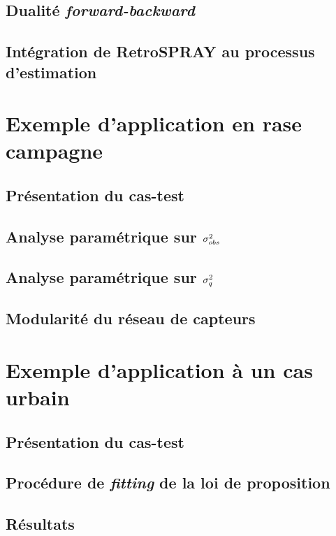 \subsection{Dualité \textit{forward-backward}}

\subsection{Intégration de RetroSPRAY au processus d'estimation}

\section{Exemple d'application en rase campagne}

\subsection{Présentation du cas-test}

\subsection{Analyse paramétrique sur ${\sigma_{obs}^2}$}

\subsection{Analyse paramétrique sur $\sigma_q^2$}

\subsection{Modularité du réseau de capteurs}

\section{Exemple d'application à un cas urbain}

\subsection{Présentation du cas-test}

\subsection{Procédure de \textit{fitting} de la loi de proposition}

\subsection{Résultats}





